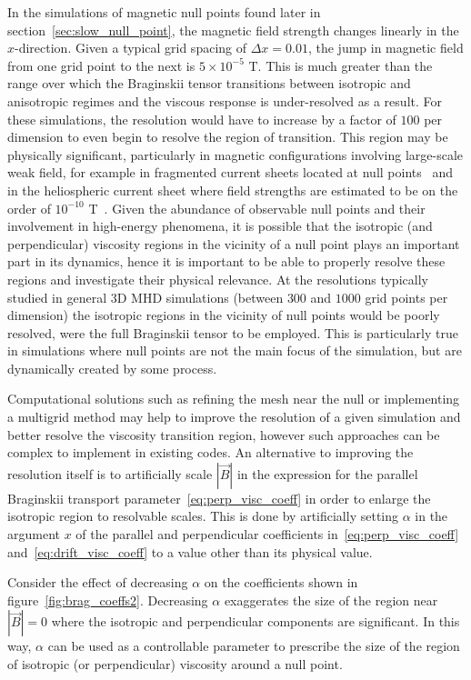 In the simulations of magnetic null points found later in section~\ref{sec:slow_null_point}, the magnetic field strength changes linearly in the $x$-direction. Given a typical grid spacing of $\Delta x = 0.01$, the jump in magnetic field from one grid point to the next is $5\times 10^{-5}$ T. This is much greater than the range over which the Braginskii tensor transitions between isotropic and anisotropic regimes and the viscous response is under-resolved as a result. For these simulations, the resolution would have to increase by a factor of $100$ per dimension to even begin to resolve the region of transition. This region may be physically significant, particularly in magnetic configurations involving large-scale weak field, for example in fragmented current sheets located at null points~\cite{wyperNonlinearTearing3D2014} and in the heliospheric current sheet where field strengths are estimated to be on the order of $10^{-10}$ T~\cite{czechowskiStructureHeliosphericCurrent2010}. Given the abundance of observable null points and their involvement in high-energy phenomena, it is possible that the isotropic (and perpendicular) viscosity regions in the vicinity of a null point plays an important part in its dynamics, hence it is important to be able to properly resolve these regions and investigate their physical relevance. At the resolutions typically studied in general 3D MHD simulations (between $300$ and $1000$ grid points per dimension) the isotropic regions in the vicinity of null points would be poorly resolved, were the full Braginskii tensor to be employed. This is particularly true in simulations where null points are not the main focus of the simulation, but are dynamically created by some process.

Computational solutions such as refining the mesh near the null or implementing a multigrid method may help to improve the resolution of a given simulation and better resolve the viscosity transition region, however such approaches can be complex to implement in existing codes. An alternative to improving the resolution itself is to artificially scale $|\vec{B}|$ in the expression for the parallel Braginskii transport parameter~\eqref{eq:perp_visc_coeff} in order to enlarge the isotropic region to resolvable scales. This is done by artificially setting $\alpha$ in the argument $x$ of the parallel and perpendicular coefficients in~\eqref{eq:perp_visc_coeff} and~\eqref{eq:drift_visc_coeff} to a value other than its physical value.

Consider the effect of decreasing $\alpha$ on the coefficients shown in figure~\ref{fig:brag_coeffs2}. Decreasing $\alpha$ exaggerates the size of the region near $|\vec{B}| = 0$ where the isotropic and perpendicular components are significant. In this way, $\alpha$ can be used as a controllable parameter to prescribe the size of the region of isotropic (or perpendicular) viscosity around a null point.

